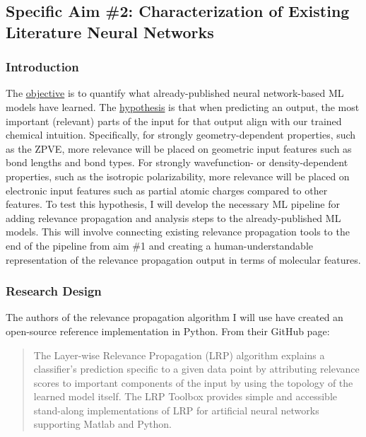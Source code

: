 \documentclass[12pt]{article}
\begin{document}
\subsection{Specific Aim \#2: Characterization of Existing Literature Neural Networks}
\label{sec:org5aa3801}

\subsubsection{Introduction}
\label{sec:orgf945f70}

The \uline{objective} is to quantify what already-published neural network-based ML models have learned. The \uline{hypothesis} is that when predicting an output, the most important (relevant) parts of the input for that output align with our trained chemical intuition. Specifically, for strongly geometry-dependent properties, such as the ZPVE, more relevance will be placed on geometric input features such as bond lengths and bond types. For strongly wavefunction- or density-dependent properties, such as the isotropic polarizability, more relevance will be placed on electronic input features such as partial atomic charges compared to other features. To test this hypothesis, I will develop the necessary ML pipeline for adding relevance propagation and analysis steps to the already-published ML models. This will involve connecting existing relevance propagation tools \cite{JMLR:v17:15-618,github:lrp,github:lrp_tf,github:lrp_tf2} to the end of the pipeline from aim \#1 and creating a human-understandable representation of the relevance propagation output in terms of molecular features.

\subsubsection{Research Design}
\label{sec:orge6b4255}

The authors of the relevance propagation algorithm I will use have created an open-source reference implementation in Python. From their GitHub page\cite{github:lrp}:

\begin{quote}
The Layer-wise Relevance Propagation (LRP) algorithm explains a classifier's prediction specific to a given data point by attributing relevance scores to important components of the input by using the topology of the learned model itself. The LRP Toolbox provides simple and accessible stand-along implementations of LRP for artificial neural networks supporting Matlab and Python.
\end{quote}
\end{document}
